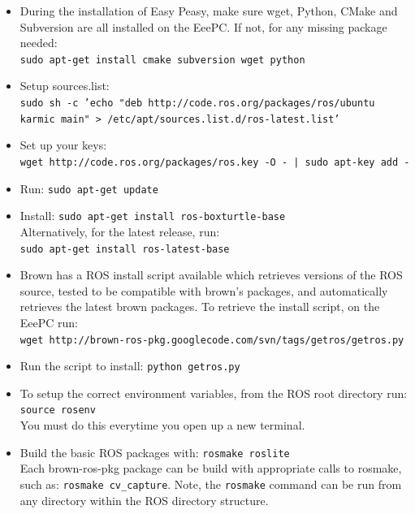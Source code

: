 \begin{itemize} 

\item During the installation of Easy Peasy, make sure wget, Python, CMake and Subversion are all installed on the EeePC. If not, for any missing package needed:\\ 
\texttt{sudo apt-get install cmake subversion wget python}

\item Setup sources.list:\\
\texttt{sudo sh -c 'echo "deb http://code.ros.org/packages/ros/ubuntu karmic main" > /etc/apt/sources.list.d/ros-latest.list'}

\item Set up your keys:\\
\texttt{wget http://code.ros.org/packages/ros.key -O - | sudo apt-key add -}

\item Run: \texttt{sudo apt-get update}

\item Install: \texttt{sudo apt-get install ros-boxturtle-base}\\
Alternatively, for the latest release, run: \\
\texttt{sudo apt-get install ros-latest-base}


\item Brown has a ROS install script available which retrieves versions of the ROS source, tested to be compatible with brown's packages, and automatically retrieves the latest brown packages. To retrieve the install script, on the EeePC run:\\
\texttt{wget http://brown-ros-pkg.googlecode.com/svn/tags/getros/getros.py}

\item Run the script to install: \texttt{python getros.py}

\item To setup the correct environment variables, from the ROS root directory run:\\ \texttt{source rosenv}\\
You must do this everytime you open up a new terminal.

\item Build the basic ROS packages with: \texttt{rosmake roslite} \\
Each brown-ros-pkg package can be build with appropriate calls to rosmake, such as: \texttt{rosmake cv\_capture}. Note, the \texttt{rosmake} command can be run from any directory within the ROS directory structure.


\end{itemize}

